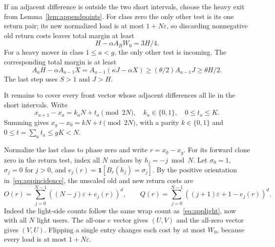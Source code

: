 \documentclass[11pt]{article}
\theoremstyle{definition}
\newcommand{\ind}{\mathbf 1}
\begin{document}
If an adjacent difference is outside the two short intervals, choose the heavy exit from Lemma~\ref{lem:appendpoints}. For class zero the only other test is its one return pair; its new normalized load is at most $1+N\varepsilon$, so discarding nonnegative old return costs leaves total margin at least
\begin{equation}\label{eq:approotexit}
 H-\alpha A_RW_0=3H/4.
\end{equation}
For a heavy mover in class $1\le a<g$, the only other test is incoming. The corresponding total margin is at least
\begin{equation}\label{eq:appmiddleexit}
 A_aH-\alpha A_{a-1}X
 =A_{a-1}(\kappa J-\alpha X)
 \ge(\theta/2)A_{a-1}J\ge\theta H/2.
\end{equation}
The last step uses $S>1$ and $J>H$.

It remains to cover every front vector whose adjacent differences all lie in the short intervals. Write
\begin{equation}\label{eq:appshortdifferences}
 x_{a+1}-x_a=k_aN+t_a\pmod{2N},\quad
 k_a\in\{0,1\},\quad0\le t_a\le K.
\end{equation}
Summing gives $x_g-x_0=kN+t\pmod{2N}$, with a parity $k\in\{0,1\}$ and $0\le t=\sum_at_a\le gK<N$.

Normalize the last class to phase zero and write $r=x_0-x_g$. For its forward clone zero in the return test, index all $N$ anchors by $h_j=-j\bmod N$. Let $\sigma_0=1$, $\sigma_j=0$ for $j>0$, and $e_j(r)=\ind[B_r(h_j)=\sigma_j]$. By the positive orientation in~\eqref{eq:appincidence}, the unscaled old and new return costs are
\begin{equation}\label{eq:appreturncosts}
 O(r)=\sum_{j=0}^{N-1}((N-j)\varepsilon+e_j(r))^d,\qquad
 Q(r)=\sum_{j=0}^{N-1}((j+1)\varepsilon+1-e_j(r))^d.
\end{equation}
Indeed the light-side counts follow the same wrap count as~\eqref{eq:applight}, now with all $N$ light users. The all-one $e$ vector gives $(U,V)$ and the all-zero vector gives $(V,U)$. Flipping a single entry changes each cost by at most $W_0$, because every load is at most $1+N\varepsilon$.
\end{document}
